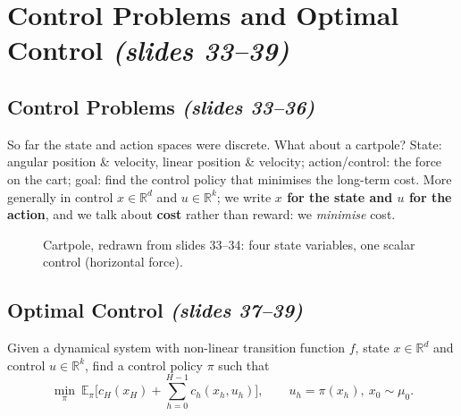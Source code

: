\documentclass[11pt,a4paper]{article}
\newcommand{\E}{\mathbb{E}}
\newcommand{\R}{\mathbb{R}}
\newcommand{\slides}[1]{\emph{(slides #1)}}
\theoremstyle{plain}
\theoremstyle{definition}
\theoremstyle{remark}
\begin{document}
\section{Control Problems and Optimal Control \slides{33--39}}

\subsection{Control Problems \slides{33--36}}

So far the state and action spaces were discrete. What about a cartpole? State: angular position \& velocity, linear position \& velocity; action/control: the force on the cart; goal: find the control policy that minimises the long-term cost. More generally in control $x\in\R^d$ and $u\in\R^k$; we write \textbf{$x$ for the state and $u$ for the action}, and we talk about \textbf{cost} rather than reward: we \emph{minimise} cost.

\begin{figure}[H]
\centering
{}
\caption{Cartpole, redrawn from slides 33--34: four state variables, one scalar control (horizontal force).}
\end{figure}

\subsection{Optimal Control \slides{37--39}}

\begin{definition}
Given a dynamical system with non-linear transition function $f$, state $x\in\R^d$ and control $u\in\R^k$, find a control policy $\pi$ such that
\[
\min_\pi\ \E_\pi\Big[c_H(x_H)+\sum_{h=0}^{H-1}c_h(x_h,u_h)\Big],\qquad u_h=\pi(x_h),\ x_0\sim\mu_0 .
\]
\end{definition}
\end{document}

